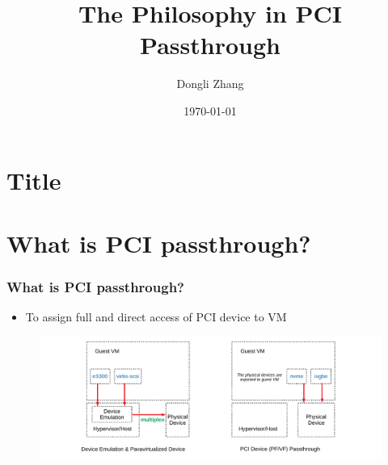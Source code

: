 \documentclass[aspectratio=169]{beamer}
\title[The Philosophy in PCI Passthrough]{The Philosophy in PCI Passthrough} %
\author{Dongli Zhang} %
\date{\today} %
\begin{document}

\section{Title}
\begin{frame}
\titlepage %
\end{frame}


\section{What is PCI passthrough?}
\begin{frame}
\frametitle{What is PCI passthrough?}
\begin{itemize}
\item To assign full and direct access of PCI device to VM
\begin{itemize}
\end{itemize}
\end{itemize}
\begin{figure}
\includegraphics[width=1.0\linewidth]{figures/passthrough.pdf}
\end{figure}
\end{frame}

\end{document}
